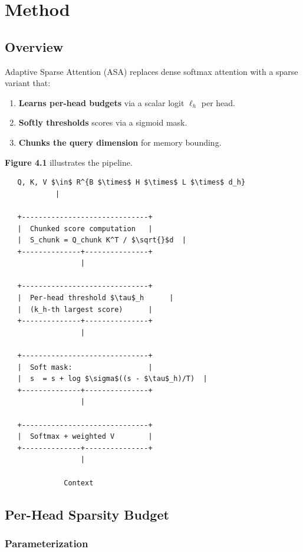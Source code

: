 
\section{Method}

\subsection{Overview}

Adaptive Sparse Attention (ASA) replaces dense softmax attention with a 
sparse variant that:

\begin{enumerate}
\item \textbf{Learns per-head budgets} via a scalar logit $\ell_h$ per head.
\item \textbf{Softly thresholds} scores via a sigmoid mask.
\item \textbf{Chunks the query dimension} for memory bounding.

\end{enumerate}
\textbf{Figure 4.1} illustrates the pipeline.

\begin{lstlisting}
   Q, K, V $\in$ R^{B $\times$ H $\times$ L $\times$ d_h}
            |
             
   +------------------------------+
   |  Chunked score computation   |
   |  S_chunk = Q_chunk K^T / $\sqrt{}$d  |
   +--------------+---------------+
                  |
                   
   +------------------------------+
   |  Per-head threshold $\tau$_h      |
   |  (k_h-th largest score)      |
   +--------------+---------------+
                  |
                   
   +------------------------------+
   |  Soft mask:                  |
   |  s  = s + log $\sigma$((s - $\tau$_h)/T)  |
   +--------------+---------------+
                  |
                   
   +------------------------------+
   |  Softmax + weighted V        |
   +--------------+---------------+
                  |
                   
              Context
\end{lstlisting}

\subsection{Per-Head Sparsity Budget}

\subsubsection{Parameterization}

